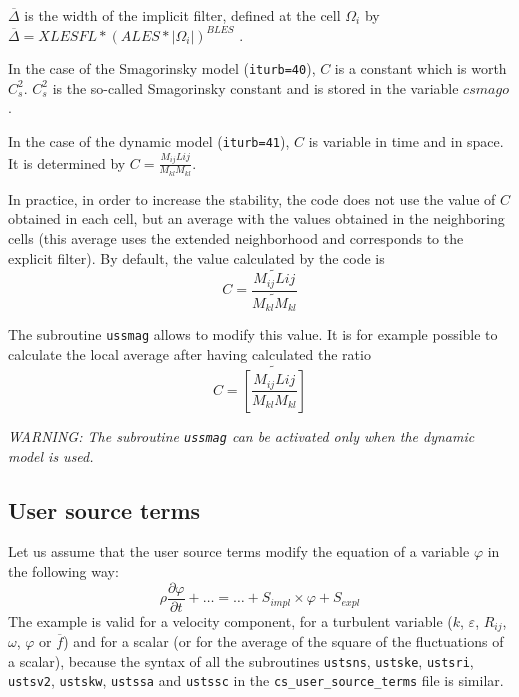 {{{$\overline{\Delta}$ is the width of the implicit filter, defined at the
cell $\Omega_i$ by \\
$\overline{\Delta}=XLESFL*(ALES*|\Omega_i|)^{BLES}$
.

In the case of the Smagorinsky model (\texttt{iturb=40}), $C$ is a
constant which is worth $C_s^2$. $C_s^2$ is the so-called Smagorinsky
constant and is stored in the variable \texttt{$csmago$}.

In the case of the dynamic model (\texttt{iturb=41}), $C$ is variable in
time and in space. It is determined by
$\displaystyle C=\frac{M_{ij}L{ij}}{M_{kl}M_{kl}}$.

In practice, in order to increase the stability, the code does not use the
value of $C$ obtained in each cell, but an average with the values
obtained in the neighboring cells (this average uses the extended
neighborhood and corresponds to the explicit filter). By default, the
value calculated by the code is
\begin{displaymath}
C=\frac{\widetilde{M_{ij}L{ij}}}{\widetilde{M_{kl}M_{kl}}}
\end{displaymath}

The subroutine \texttt{ussmag} allows to modify this value. It is for
example possible to calculate the local average after having calculated the
ratio
\begin{displaymath}
C=\widetilde{\left[\frac{M_{ij}L{ij}}{M_{kl}M_{kl}}\right]}
\end{displaymath}

{\em WARNING: The subroutine {\em\texttt{ussmag}} can be activated only when
the dynamic model is used.}

\subsection{User source terms}
\label{prg_usersourceterms}

Let us assume that the user source terms modify the equation of a
variable $\varphi$ in the following way:
\begin{displaymath}
\rho\frac{\partial \varphi}{\partial t}+\ldots = \ldots + S_{impl}\times\varphi+S_{expl}
\end{displaymath}
The example is valid for a velocity component, for a turbulent variable ($k$, $\varepsilon$, $R_{ij}$, $\omega$,
$\varphi$ or $\overline{f}$) and for a scalar (or for the average of the
square of the fluctuations of a scalar), because the syntax of all the
subroutines \texttt{ustsns}, \texttt{ustske}, \texttt{ustsri}, \texttt{ustsv2},
\texttt{ustskw}, \texttt{ustssa} and \texttt{ustssc} in the \texttt{cs\_user\_source\_terms} file is similar.

}}}
